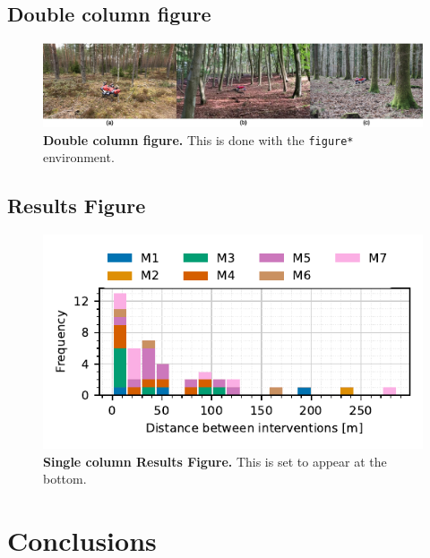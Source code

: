 \documentclass[letterpaper, 10 pt, conference]{ieeeconf}  %
\begin{document}
\subsection{Double column figure}
{\color{gray}{\lipsum[1-3]}}

\begin{figure}[ht]
    \centering
    \includegraphics[width=\textwidth]{figs/deployments_ws.jpg}
    \caption{\textbf{Double column figure.} This is done with the \texttt{figure*} environment.}
    \label{fig:double-column}
\end{figure}

{\color{gray}{\lipsum[1-3]}}


\subsection{Results Figure}
{\color{gray}{\lipsum[1-3]}}
\begin{figure}[b]
    \centering
    \includegraphics[width=\columnwidth]{figs/distance_between_interventions_distribution.pdf}
    \caption{\textbf{Single column Results Figure.} This is set to appear at the bottom.}
    \label{fig:double-column}
\end{figure}

{\color{gray}{\lipsum[1-3]}}


\section{Conclusions}
\end{document}
